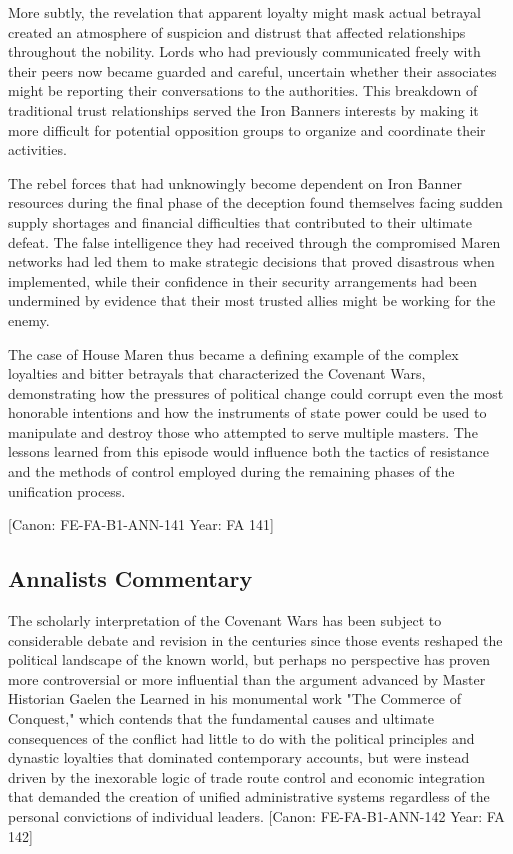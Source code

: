 More subtly, the revelation that apparent loyalty might mask actual
betrayal created an atmosphere of suspicion and distrust that affected
relationships throughout the nobility. Lords who had previously
communicated freely with their peers now became guarded and careful,
uncertain whether their associates might be reporting their
conversations to the authorities. This breakdown of traditional trust
relationships served the Iron Banner\textquotesingle s interests by
making it more difficult for potential opposition groups to organize and
coordinate their activities.

The rebel forces that had unknowingly become dependent on Iron Banner
resources during the final phase of the deception found themselves
facing sudden supply shortages and financial difficulties that
contributed to their ultimate defeat. The false intelligence they had
received through the compromised Maren networks had led them to make
strategic decisions that proved disastrous when implemented, while their
confidence in their security arrangements had been undermined by
evidence that their most trusted allies might be working for the enemy.

The case of House Maren thus became a defining example of the complex
loyalties and bitter betrayals that characterized the Covenant Wars,
demonstrating how the pressures of political change could corrupt even
the most honorable intentions and how the instruments of state power
could be used to manipulate and destroy those who attempted to serve
multiple masters. The lessons learned from this episode would influence
both the tactics of resistance and the methods of control employed
during the remaining phases of the unification process.

{[}Canon: FE-FA-B1-ANN-141 \textbar{} Year: FA 141{]}

\subsection{Annalist\textquotesingle s
Commentary}\label{annalists-commentary-1}

The scholarly interpretation of the Covenant Wars has been subject to
considerable debate and revision in the centuries since those events
reshaped the political landscape of the known world, but perhaps no
perspective has proven more controversial or more influential than the
argument advanced by Master Historian Gaelen the Learned in his
monumental work "The Commerce of Conquest," which contends that the
fundamental causes and ultimate consequences of the conflict had little
to do with the political principles and dynastic loyalties that
dominated contemporary accounts, but were instead driven by the
inexorable logic of trade route control and economic integration that
demanded the creation of unified administrative systems regardless of
the personal convictions of individual leaders. {[}Canon:
FE-FA-B1-ANN-142 \textbar{} Year: FA 142{]}


